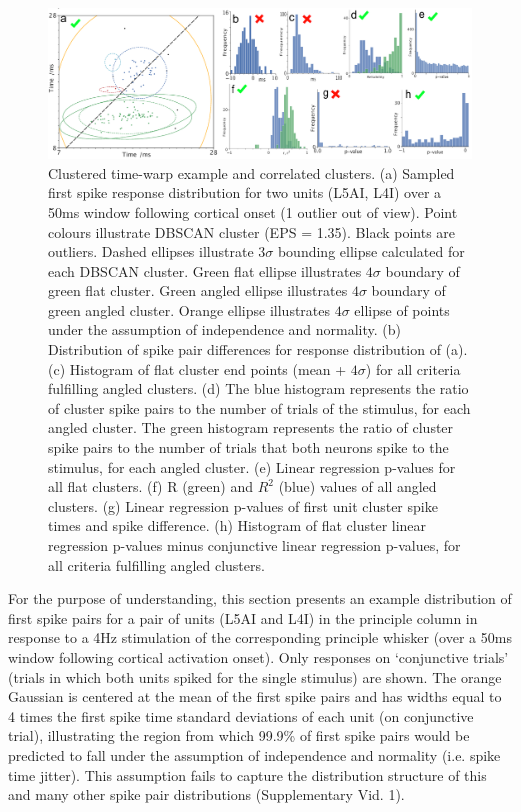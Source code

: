 \documentclass{article}
\begin{document}
\begin{figure}[t!]
\centering
\includegraphics[width=\textwidth]{Figure3.pdf}
\caption{Clustered time-warp example and correlated clusters. (a) Sampled first spike response distribution for two units (L5AI, L4I) over a 50ms window following cortical onset (1 outlier out of view). Point colours illustrate DBSCAN cluster (EPS = 1.35). Black points are outliers. Dashed ellipses illustrate $3\sigma$ bounding ellipse calculated for each DBSCAN cluster. Green flat ellipse illustrates $4\sigma$ boundary of green flat cluster. Green angled ellipse illustrates $4\sigma$ boundary of green angled cluster. Orange ellipse illustrates $4\sigma$ ellipse of points under the assumption of independence and normality. (b) Distribution of spike pair differences for response distribution of (a). (c) Histogram of flat cluster end points (mean + $4\sigma$) for all criteria fulfilling angled clusters. (d) The blue histogram represents the ratio of cluster spike pairs to the number of trials of the stimulus, for each angled cluster. The green histogram represents the ratio of cluster spike pairs to the number of trials that both neurons spike to the stimulus, for each angled cluster. (e) Linear regression p-values for all flat clusters. (f) R (green) and $R^2$ (blue) values of all angled clusters. (g) Linear regression p-values of first unit cluster spike times and spike difference. (h) Histogram of flat cluster linear regression p-values minus conjunctive linear regression p-values, for all criteria fulfilling angled clusters.}
\label{fig:fig3}
\end{figure}


For the purpose of understanding, this section presents an example distribution of first spike pairs for a pair of units (L5AI and L4I) in the principle column in response to a 4Hz stimulation of the corresponding principle whisker (over a 50ms window following cortical activation onset). Only responses on `conjunctive trials' (trials in which both units spiked for the single stimulus) are shown. The orange Gaussian is centered at the mean of the first spike pairs and has widths equal to 4 times the first spike time standard deviations of each unit (on conjunctive trial), illustrating the region from which 99.9\% of first spike pairs would be predicted to fall under the assumption of independence and normality (i.e. spike time jitter). This assumption fails to capture the distribution structure of this and many other spike pair distributions (Supplementary Vid. 1). 
\end{document}
